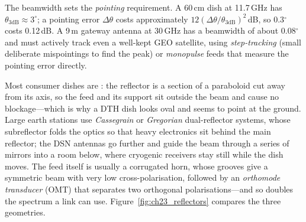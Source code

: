 The beamwidth sets the \emph{pointing} requirement. A 60\,cm dish at 11.7\,GHz has
$\theta_{3\text{dB}}\approx3^\circ$; a pointing error $\Delta\theta$ costs approximately
$12(\Delta\theta/\theta_{3\text{dB}})^2$\,dB, so 0.3$^\circ$ costs 0.12\,dB. A 9\,m gateway antenna at
30\,GHz has a beamwidth of about 0.08$^\circ$ and must actively track even a well-kept GEO
satellite, using \emph{step-tracking} (small deliberate mispointings to find the peak) or
\emph{monopulse} feeds that measure the pointing error directly.

Most consumer dishes are : the reflector is a section of a paraboloid cut away
from its axis, so the feed and its support sit outside the beam and cause no blockage---which is
why a DTH dish looks oval and seems to point at the ground. Large earth stations use
\emph{Cassegrain} or \emph{Gregorian} dual-reflector systems, whose subreflector folds the optics
so that heavy electronics sit behind the main reflector; the DSN antennas go further and guide
the beam through a series of mirrors into a room below, where cryogenic receivers stay still while
the dish moves. The feed itself is usually a corrugated horn, whose grooves give a symmetric beam
with very low cross-polarisation, followed by an \emph{orthomode transducer} (OMT) that separates
two orthogonal polarisations---and so doubles the spectrum a link can use.
Figure~\ref{fig:ch23_reflectors} compares the three geometries.

